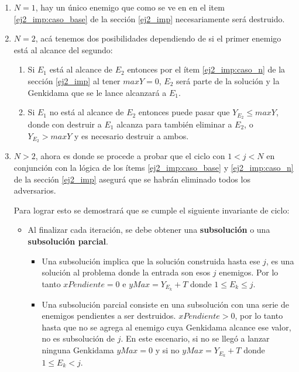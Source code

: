 	\begin{enumerate}
		\item{
			$N = 1$, hay un único enemigo que como se ve en
			en el item \ref{ej2_imp:caso_base} de la sección
			\ref{ej2_imp} necesariamente será destruido.
		}
		\item{
			$N = 2$, acá tenemos dos posibilidades dependiendo de si el primer
			enemigo está al alcance del segundo:
			\begin{enumerate}
				\item{
					Si $E_1$ está al alcance de $E_2$ entonces por el ítem
					\ref{ej2_imp:caso_n} de la sección \ref{ej2_imp}
					al tener $maxY = 0$, $E_2$ será parte de la solución y
					la Genkidama que se le lance alcanzará a $E_1$.
				}
				\item{
					Si $E_1$ no está al alcance de $E_2$ entonces puede
					pasar que $Y_{E_2} \leq maxY$, donde con destruir a
					$E_1$ alcanza para también eliminar a $E_2$, o $Y_{E_2}
					> maxY$ y es necesario destruir a ambos.
				}
			\end{enumerate}
		}
		\item{
			$N > 2$, ahora es donde se procede a probar que el ciclo con $1 < j <
			N$ en conjunción con la lógica de los ítems \ref{ej2_imp:caso_base} y
			\ref{ej2_imp:caso_n} de la sección \ref{ej2_imp} asegurá que se habrán
			eliminado todos los adversarios.

			Para lograr esto se demostrará que se cumple el siguiente invariante de
			ciclo:

			\begin{itemize}
				\item{
					Al finalizar cada iteración, se debe obtener una
					\textbf{subsolución} o una \textbf{subsolución parcial}.
				}
				\begin{itemize}
					\item{
						Una subsolución implica que la solución construida hasta
						ese $j$, es una solución al problema donde la entrada
						son esos $j$ enemigos. Por lo tanto $xPendiente = 0$ e
						$yMax = Y_{E_k} + T$ donde $1 \leq E_k \leq j$.
					}
					\item{
						Una subsolución parcial consiste en una subsolución con
						una serie de enemigos pendientes a ser destruidos.
						$xPendiente > 0$, por lo tanto hasta que no se agrega al
						enemigo cuya Genkidama alcance ese valor, no
						es subsolución de $j$. En este escenario, si no se llegó
						a lanzar ninguna Genkidama $yMax = 0$ y si no $yMax =
						Y_{E_k} + T$ donde $1 \leq E_k < j$.
					}
				\end{itemize}
			\end{itemize}

}
\end{enumerate}
